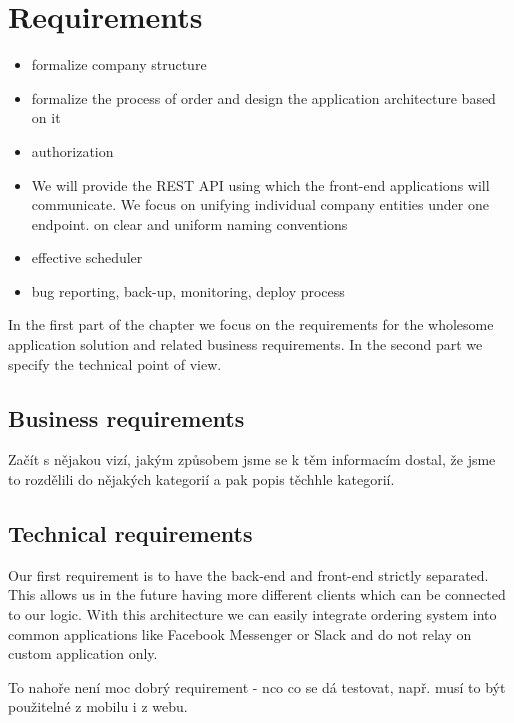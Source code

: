 \chapter{Requirements}




\begin{itemize}
	\item formalize company structure
	\item formalize the process of order and design the application architecture based on it
	\item authorization
	\item We will provide the REST API using which the front-end applications will communicate. We focus on unifying individual company entities under one endpoint.
	on clear and uniform naming conventions 
	\item effective scheduler
	\item bug reporting, back-up, monitoring, deploy process
\end{itemize}





In the first part of the chapter we focus on the requirements for the wholesome application solution and related business requirements. In the second part we specify the technical point of view.

\section{Business requirements}
Začít s nějakou vizí, jakým způsobem jsme se k těm informacím dostal, že jsme to rozdělili do nějakých kategorií a pak popis těchhle kategorií.





\section{Technical requirements}
	Our first requirement is to have the back-end and front-end strictly separated. This allows us in the future having more different clients which can be connected to our logic. With this architecture we can easily integrate ordering system into common applications like Facebook Messenger or Slack and do not relay on custom application only.
	
	To nahoře není moc dobrý requirement - nco co se dá testovat, např. musí to být použitelné z mobilu i z webu.
	
